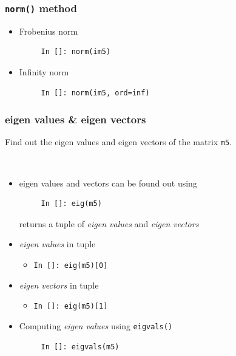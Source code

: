 \documentclass[presentation]{beamer}
\begin{document}
\begin{frame}[fragile]
\frametitle{\verb~norm()~ method}
\label{sec-10}


\begin{itemize}
\item Frobenius norm
\begin{verbatim}
     In []: norm(im5)
\end{verbatim}

\item Infinity norm
\begin{verbatim}
     In []: norm(im5, ord=inf)
\end{verbatim}

\end{itemize}
\end{frame}
\begin{frame}[fragile]
\frametitle{eigen values \& eigen vectors}
\label{sec-11}

  Find out the eigen values and eigen vectors of the matrix \verb~m5~.
\begin{verbatim}
   
\end{verbatim}


\begin{itemize}
\item eigen values and vectors can be found out using
\begin{verbatim}
     In []: eig(m5)
\end{verbatim}

    returns a tuple of \emph{eigen values} and \emph{eigen vectors}
\item \emph{eigen values} in tuple
\begin{itemize}
\item \verb~In []: eig(m5)[0]~
\end{itemize}
\item \emph{eigen vectors} in tuple
\begin{itemize}
\item \verb~In []: eig(m5)[1]~
\end{itemize}
\item Computing \emph{eigen values} using \verb~eigvals()~
\begin{verbatim}
     In []: eigvals(m5)
\end{verbatim}

\end{itemize}
\end{frame}
\end{document}
